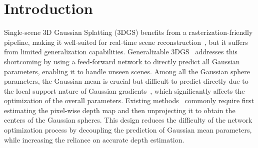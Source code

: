 \section{Introduction}
\label{sec:intro}

Single-scene 3D Gaussian Splatting (3DGS) benefits from a rasterization-friendly pipeline, making it well-suited for real-time scene reconstruction~\cite{kerbl20233d, yu2024mip}, but it suffers from limited generalization capabilities.
%
Generalizable 3DGS~\cite{charatan2024pixelsplat, chen2024mvsplat, liu2024mvsgaussian, xu2025depthsplat, zhang2024gaussian} addresses this shortcoming by using a feed-forward network to directly predict all Gaussian parameters, enabling it to handle unseen scenes.
%
Among all the Gaussian sphere parameters, the Gaussian mean is crucial but difficult to predict directly due to the local support nature of Gaussian gradients~\cite{charatan2024pixelsplat}, which significantly affects the optimization of the overall parameters.
% 
% 
Existing methods~\cite{chen2024mvsplat, liu2025monosplat, zhang2025transplat, xu2025depthsplat} commonly require first estimating the pixel-wise depth map and then unprojecting it to obtain the centers of the Gaussian spheres.
% 
%
This design reduces the difficulty of the network optimization process by decoupling the prediction of Gaussian mean parameters, while increasing the reliance on accurate depth estimation.


